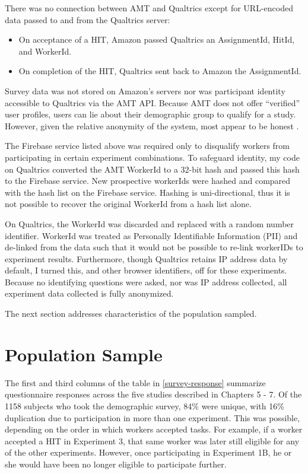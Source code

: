 There was no connection between AMT and Qualtrics except for URL-encoded data passed to and from the Qualtrics server:

\begin{itemize}
\item On acceptance of a HIT, Amazon passed Qualtrics an AssignmentId, HitId, and WorkerId. 
\item On completion of the HIT, Qualtrics sent back to Amazon the AssignmentId. 
\end{itemize}

Survey data was not stored on Amazon's servers nor was participant identity accessible to Qualtrics via the AMT API. Because AMT does not offer ``verified'' user profiles, users can lie about their demographic group to qualify for a study. However, given the relative anonymity of the system, most appear to be honest  \citep{Ipeirotis:2010jo}.  

The Firebase service listed above was required only to disqualify workers from participating in certain experiment combinations. To safeguard identity, my code on Qualtrics converted the AMT WorkerId to a 32-bit hash and passed this hash to the Firebase service. New prospective workerIds were hashed and compared with the hash list on the Firebase service. Hashing is uni-directional, thus it is not possible to recover the original WorkerId from a hash list alone. 

On Qualtrics, the WorkerId was discarded and replaced with a random number identifier. WorkerId was treated as Personally Identifiable Information (PII) and de-linked from the data such that it would not be possible to re-link workerIDs to experiment results. Furthermore, though Qualtrics retains IP address data by default, I turned this, and other browser identifiers, off for these experiments. Because no identifying questions were asked, nor was IP address collected, all experiment data collected is fully anonymized. 

The next section addresses characteristics of the population sampled.

\section{Population Sample}
\label{populationsample}

The first and third columns of the table in  \autoref{survey-response}  summarize questionnaire responses across the five studies described in Chapters 5 - 7. Of the 1158 subjects who took the demographic survey, 84\% were unique, with 16\% duplication due to participation in more than one experiment. This was possible, depending on the order in which workers accepted tasks. For example, if a worker accepted a HIT in Experiment 3, that same worker was later still eligible for any of the other experiments. However, once participating in Experiment 1B, he or she would have been no longer eligible to participate further.

